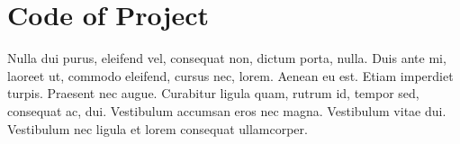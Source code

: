 \chapter{Code of Project}%
\label{chapter:appendixA}

Nulla dui purus, eleifend vel, consequat non, dictum porta, nulla. Duis ante mi, laoreet ut, commodo eleifend, cursus nec, lorem. Aenean eu est. Etiam imperdiet turpis. Praesent nec augue. Curabitur ligula quam, rutrum id, tempor sed, consequat ac, dui. Vestibulum accumsan eros nec magna. Vestibulum vitae dui. Vestibulum nec ligula et lorem consequat ullamcorper. 

% 
%
    
    
    
    
    
    
    
